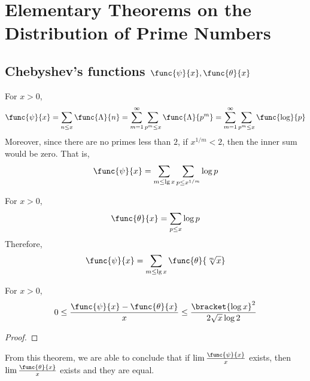 \chapter{Elementary Theorems on the Distribution of Prime Numbers}
\section{Chebyshev's functions \(\func{\psi}{x}, \func{\theta}{x}\)}
\begin{definition}
    For \(x > 0\),
    \begin{equation*}
        \func{\psi}{x} = \sum_{n \leq x} \func{\Lambda}{n} = \sum_{m = 1}^{\infty} \sum_{p^m \leq x}\func{\Lambda}{p^m} =  \sum_{m = 1}^{\infty} \sum_{p^m \leq x}\func{\log}{p} 
    \end{equation*}
    Moreover, since there are no primes less than \(2\), if \(x^{1/m} < 2\), then the inner sum would be zero. That is,
    \begin{equation*}
        \func{\psi}{x} = \sum_{m \leq \lg x} \sum_{p \leq x^{1/m}} \log p
    \end{equation*}
\end{definition}

\begin{definition}
    For \(x > 0\), 
    \begin{equation*}
        \func{\theta}{x} = \sum_{p \leq x} \log p
    \end{equation*}
    Therefore, 
    \begin{equation*}
        \func{\psi}{x} = \sum_{m \leq \lg x} \func{\theta}{\sqrt[m]{x}}
    \end{equation*}
\end{definition}

\begin{theorem}
    For \(x > 0\), 
    \begin{equation*}
        0 \leq \dfrac{\func{\psi}{x} - \func{\theta}{x}}{x} \leq \dfrac{\bracket{\log x}^2}{2 \sqrt{x} \log 2}
    \end{equation*}
\end{theorem}
\begin{proof}
    
\end{proof}

From this theorem, we are able to conclude that if \(\lim \frac{\func{\psi}{x}}{x}\) exists, then \(\lim \frac{\func{\theta}{x}}{x}\) exists and they are equal.
